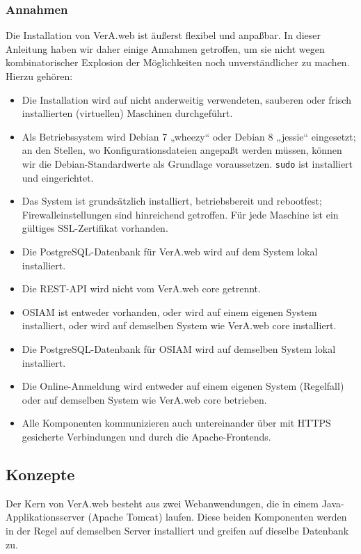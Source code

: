 \subsubsection{Annahmen}\label{subsubsec:aboutmanual-assume}

Die Installation von VerA.web ist äußerst flexibel und anpaßbar.
In dieser Anleitung haben wir daher einige Annahmen getroffen, um
sie nicht wegen kombinatorischer Explosion der Möglichkeiten noch
unverständlicher zu machen. Hierzu gehören:\keinumbruch

\begin{itemize}
 \item{Die Installation wird auf nicht anderweitig verwendeten,
  sauberen oder frisch installierten (virtuellen) Maschinen durchgeführt.}
 \item{Als Betriebssystem wird Debian 7 „wheezy“ oder Debian 8
  „jessie“ eingesetzt; an den Stellen, wo Konfigurationsdateien
  angepaßt werden müssen, können wir die Debian-Standardwerte
  als Grundlage voraussetzen. \texttt{sudo} ist installiert
  und eingerichtet.}
 \item{Das System ist grundsätzlich installiert, betriebsbereit
  und rebootfest; Firewalleinstellungen sind hinreichend getroffen.
  Für jede Maschine ist ein gültiges SSL-Zertifikat vorhanden.}
 \item{Die PostgreSQL-Datenbank für VerA.web wird auf dem System
  lokal installiert.}
 \item{Die REST-API wird nicht vom VerA.web core getrennt.}
\ifoa
 \item{OSIAM ist entweder vorhanden, oder wird auf einem eigenen
  System installiert, oder wird auf demselben System wie VerA.web
  core installiert.}
 \item{Die PostgreSQL-Datenbank für OSIAM wird auf demselben
  System lokal installiert.}
 \item{Die Online-Anmeldung wird entweder auf einem eigenen System
  (Regelfall) oder auf demselben System wie VerA.web core betrieben.}
 \item{Alle Komponenten kommunizieren auch untereinander über mit
  HTTPS gesicherte Verbindungen und durch die Apache-Frontends.}
\fi%
\end{itemize}

\subsection{Konzepte}\label{subsec:concepts}

Der Kern von VerA.web besteht aus zwei Webanwendungen, die in einem
Java-Applikationsserver (Apache Tomcat) laufen. Diese beiden Komponenten
werden in der Regel auf demselben Server installiert und greifen auf
dieselbe Datenbank zu.

